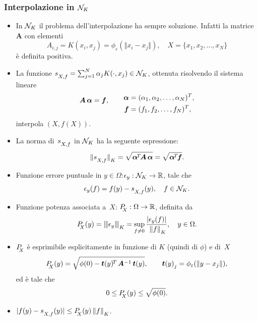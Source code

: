 \documentclass[10pt]{beamer}
\theoremstyle{definition}
\theoremstyle{plain}
\def\R{\mathbb R}
\def\Cal#1{{\cal #1}}
\def\norm#1{\Vert #1\Vert}
\def\opnorm#1{|\mskip-1.5mu|\mskip-1.5mu|#1|\mskip-1.5mu|\mskip-1.5mu|}
\def\hbyw#1#2{\vbox to #1{\vfil \hbox to #2{\hfil}}}
\def\hbywtop#1#2{\vtop to #1{\vfil \hbox to #2{\hfil}}}
\def\lK{{\lower.5ex\hbox{$\scriptstyle K$}}}
\def\lX{{\!\!\lower.5ex\hbox{$\scriptstyle X$}}}
\def\lXf{{\lower.5ex\hbox{$\scriptstyle X, f$}}}
\begin{document}
\begin{frame}
\frametitle{Interpolazione in $\Cal N_K$}
\begin{itemize}
\item 
In $\Cal N_K$ il problema dell’interpolazione ha sempre soluzione.  Infatti la matrice $\bm A$ con elementi
$$
A_{i,j} = K(x_i, x_j) = \phi_\varepsilon( \norm{x_i-x_j}), \quad  X=\{x_1,x_2,\dots,x_N\}
$$
è definita positiva.

\item
La funzione $s_\lXf = \sum_{j=1}^N \alpha_j K(\cdot, x_j)\in\Cal N_K$, ottenuta risolvendo il sistema lineare
 $$
 \bm A\,\bm\alpha = \bm f, \qquad  \lower1ex\hbox{$\begin{aligned} 
 								\bm\alpha &= (\alpha_1,\alpha_2,\dots,\alpha_N)^T, \\
								\bm f &= (f_1,f_2,\dots,f_N)^T,
								\end{aligned}$}
$$
interpola $(X, f(X))$.
\item
La norma di~$s_\lXf$ in $\Cal N_K$ ha la seguente espressione:
$$
\norm{s_\lXf}_\lK= \sqrt{\hbywtop{.2ex}{0em}\hbyw{1.8ex}{0em}\bm\alpha^{\!T\!}\bm A\,\bm\alpha} = \sqrt{\hbywtop{.2ex}{0em}\hbyw{1.8ex}{0em}\bm\alpha^{\!T\!}\bm f}.
$$
\end{itemize}
\end{frame}


\begin{frame}
\begin{itemize}
\item
Funzione \alert{errore puntuale} in $y\in\Omega$:\quad $\epsilon_y:\Cal N_K\to\R$, tale che 
$$
\epsilon_y(f) = f(y)-s_\lXf(y),\quad f\in\Cal N_K.
$$

\item
Funzione \alert{potenza} associata a~$X$: \quad $P_{\lX}:\Omega\to\R$, definita da
$$
P_\lX(y) = \opnorm{\epsilon_y}_\lK = \sup_{f\neq 0} \frac{|\epsilon_y(f)|}{\,\,\norm f_\lK}, \quad y\in\Omega.
$$

\item 
$P_\lX$ è esprimibile esplicitamente in funzione di $K$ (quindi di $\phi$) e di~$X$
$$
P_\lX(y) = \sqrt{\phi(0)-\bm t(y)^{\!T\,}\bm A^{-1}\, \bm t(y)},\qquad \bm t(y)_{\lower.4ex\hbox{$\scriptstyle j$}} = \phi_\varepsilon(\norm{y-x_j}),
$$
ed è tale che
$$
0\leq P_\lX(y)\leq\sqrt{\phi(0)}.
$$

\medskip

\item $|f(y)-s_\lXf(y)| \leq P_\lX(y)\, \norm f_\lK$.

\end{itemize}


\end{frame}
\end{document}
